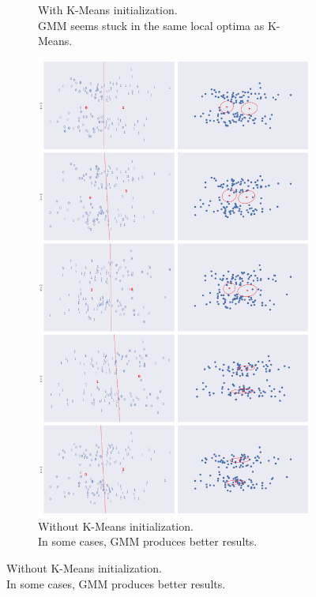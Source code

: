 \documentclass[a4paper,11pt]{article}
\begin{document}
\begin{figure}
\begin{subfigure}[b]{0.45\textwidth}
        \caption{\small{With K-Means initialization.
                \\ GMM seems stuck in the same local optima as K-Means.}}
        \label{fig:assignment8_1}
    \end{subfigure}
    \hfill
    \begin{subfigure}[b]{0.45\textwidth}
        \includegraphics[scale=0.15]{../images/assignment8_no_kmeans_init.png}
        \caption{\small{Without K-Means initialization.
                \\ In some cases, GMM produces better results.}}
        \label{fig:assignment8_2}

\end{subfigure}
\end{figure}
\end{document}
